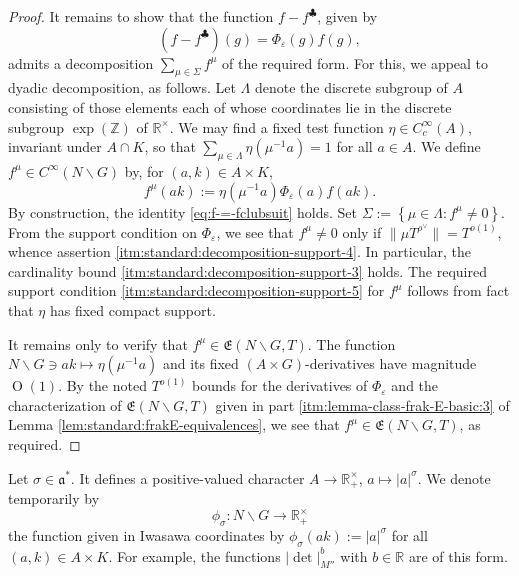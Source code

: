 \documentclass[reqno]{amsart}
\def\eps{\varepsilon}
\def\O{\operatorname{O}}
\theoremstyle{plain} \newtheorem{theorem} {Theorem}
\theoremstyle{definition} \newtheorem{definition} [theorem] {Definition}
\theoremstyle{itplain} %
\numberwithin{equation}{section}
\numberwithin{theorem}{section}
\begin{document}
\begin{proof}
  It remains to show that the function $f - f ^{\clubsuit}$, given by
  \begin{equation*}
    (f - f ^{\clubsuit})(g) =  \Phi_\eps(g) f(g),
  \end{equation*}
  admits a decomposition $\sum_{\mu \in \Sigma} f^\mu$ of the required form.  For this, we appeal to dyadic decomposition, as follows.  Let $\Lambda$ denote the discrete subgroup of $A$ consisting of those elements each of whose coordinates lie in the discrete subgroup $\exp(\mathbb{Z})$ of $\mathbb{R}^\times$.  We may find a fixed test function $\eta \in C_c^\infty(A)$, invariant under $A \cap K$, so that $\sum_{\mu \in \Lambda} \eta(\mu^{-1} a) = 1$ for all $a \in A$.  We define $f^{\mu} \in C^\infty(N \backslash G)$ by, for $(a,k) \in A \times K$,
  \begin{equation*}
    f^{\mu}(a k) := \eta(\mu^{-1} a) \Phi_\eps(a) f(a k).
  \end{equation*}
  By construction, the identity \eqref{eq:f-=-fclubsuit} holds.  Set $\Sigma := \left\{ \mu \in \Lambda : f^\mu \neq 0 \right\}$.  From the support condition on $\Phi_\eps$, we see that $f ^\mu \neq 0$ only if $\|\mu T^{\rho^\vee}\| = T^{o(1)}$, whence assertion \eqref{itm:standard:decomposition-support-4}.  In particular, the cardinality bound \eqref{itm:standard:decomposition-support-3} holds.  The required support condition \eqref{itm:standard:decomposition-support-5} for $f^\mu$ follows from fact that $\eta$ has fixed compact support.

  It remains only to verify that $f^{\mu} \in \mathfrak{E}(N \backslash G, T)$.
  The function $N \backslash G \ni a k \mapsto \eta(\mu^{-1} a)$ and its fixed $(A \times G)$-derivatives have magnitude $\O(1)$.  By the noted $T^{o(1)}$ bounds for the derivatives of $\Phi_\eps$ and the characterization of $\mathfrak{E}(N \backslash G, T)$ given in part \eqref{itm:lemma-class-frak-E-basic:3} of Lemma \ref{lem:standard:frakE-equivalences}, we see that $f^{\mu} \in \mathfrak{E}(N \backslash G, T)$, as required.
\end{proof}





Let $\sigma \in \mathfrak{a}^*$.  It defines a positive-valued character $A \rightarrow \mathbb{R}^\times_+$, $a \mapsto |a|^{\sigma}$.  We denote temporarily by
\begin{equation*}
\phi_\sigma : N \backslash G \rightarrow \mathbb{R}^\times_+
\end{equation*}
the function given in Iwasawa coordinates by $\phi_\sigma(a k) := |a|^{\sigma}$ for all $(a,k) \in A \times K$.  For example, the functions $|\det|_{M''}^{b}$ with $b \in \mathbb{R}$ are of this form.
\end{document}
